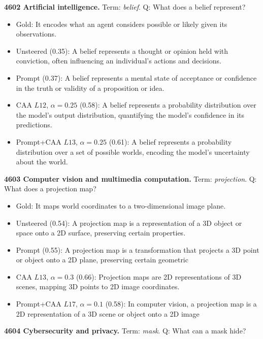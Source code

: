 \medskip\noindent\textbf{4602 Artificial intelligence.} Term: \emph{belief}.
Q: What does a belief represent?
\begin{itemize}\setlength{\itemsep}{0.15em}\setlength{\parsep}{0pt}\setlength{\topsep}{0.2em}
\item Gold: It encodes what an agent considers possible or likely given its observations.
\item Unsteered (0.35): A belief represents a thought or opinion held with conviction, often influencing an individual's actions and decisions.
\item Prompt (0.37): A belief represents a mental state of acceptance or confidence in the truth or validity of a proposition or idea.
\item CAA $L12$, $\alpha=0.25$ (0.58): A belief represents a probability distribution over the model's output distribution, quantifying the model's confidence in its predictions.
\item Prompt+CAA $L13$, $\alpha=0.25$ (0.61): A belief represents a probability distribution over a set of possible worlds, encoding the model's uncertainty about the world.
\end{itemize}
\medskip\noindent\textbf{4603 Computer vision and multimedia computation.} Term: \emph{projection}.
Q: What does a projection map?
\begin{itemize}\setlength{\itemsep}{0.15em}\setlength{\parsep}{0pt}\setlength{\topsep}{0.2em}
\item Gold: It maps world coordinates to a two-dimensional image plane.
\item Unsteered (0.54): A projection map is a representation of a 3D object or space onto a 2D surface, preserving certain properties.
\item Prompt (0.55): A projection map is a transformation that projects a 3D point or object onto a 2D plane, preserving certain geometric
\item CAA $L13$, $\alpha=0.3$ (0.66): Projection maps are 2D representations of 3D scenes, mapping 3D points to 2D image coordinates.
\item Prompt+CAA $L17$, $\alpha=0.1$ (0.58): In computer vision, a projection map is a 2D representation of a 3D scene or object onto a 2D image
\end{itemize}
\medskip\noindent\textbf{4604 Cybersecurity and privacy.} Term: \emph{mask}.
Q: What can a mask hide?
